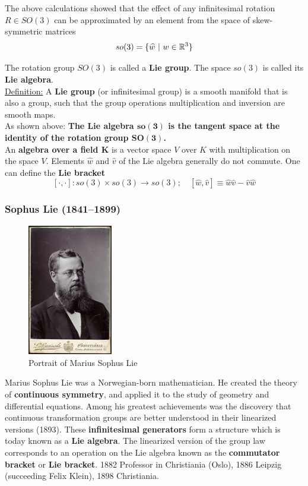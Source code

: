 The above calculations showed that the effect of any infinitesimal
rotation $R \in SO(3)$ can be approximated by an element from
the space of skew-symmetric matrices
	\[so(3) = \{ \widehat{w}\ |\ w \in \mathbb{R}^3\}\]

The rotation group $SO(3)$ is called a \textbf{Lie group}.
The space $so(3)$ is called its \textbf{Lie algebra}.\\

\underline{Definition:}
A \textbf{Lie group} (or infinitesimal group) is a smooth manifold that
is also a group, such that the group operations multiplication
and inversion are smooth maps.\\

As shown above: \textbf{The Lie algebra $\bm{so(3)}$ is the tangent space
at the identity of the rotation group $\bm{SO(3)}$.}\\

An \textbf{algebra over a field $\bm{K}$} is a vector space $V$ over $K$
with multiplication on the space $V$.
Elements $\widehat{w}$ and $\widehat{v}$ of the Lie algebra
generally do not commute.
One can define the \textbf{Lie bracket}
\[[\cdot,\cdot]: so(3) \times so(3) \rightarrow so(3);\quad
[\widehat{w},\widehat{v}] \equiv \widehat{w}\widehat{v} - \widehat{v}\widehat{w}\]


\subsubsection{Sophus Lie (1841--1899)}
\label{ssub:sophus_lie_1841_1899_}

\begin{figure}[ht]
\centering
\includegraphics[width=10em]{img/sophus_lie.jpg}
\caption{Portrait of Marius Sophus Lie}
\end{figure}

Marius Sophus Lie was a Norwegian-born mathematician.
He created the theory of \textbf{continuous symmetry}, and applied it to
the study of geometry and differential equations. Among his greatest
achievements was the discovery that continuous transformation
groups are better understood in their linearized versions (1893).
These \textbf{infinitesimal generators} form a structure which is today
known as a \textbf{Lie algebra}. The linearized version of the group law
corresponds to an operation on the Lie algebra known as
the \textbf{commutator bracket} or \textbf{Lie bracket}.
1882 Professor in Christiania (Oslo),
1886 Leipzig (succeeding Felix Klein),
1898 Christiania.


